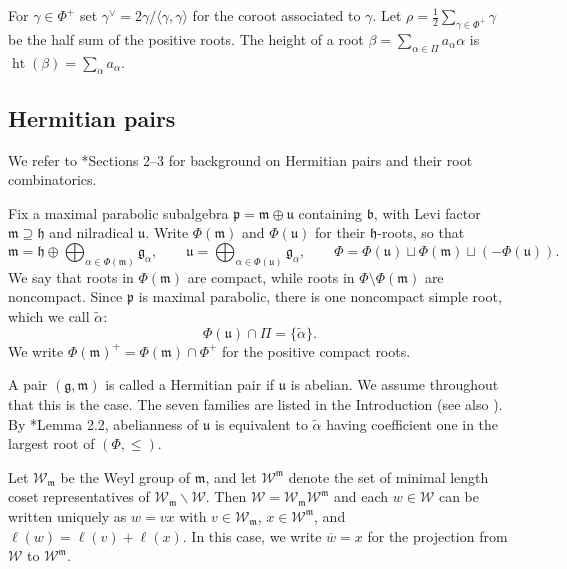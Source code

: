 \documentclass[12pt]{amsart}
\theoremstyle{definition}
\numberwithin{equation}{section}
\newcommand{\g}{\mathfrak g}
\newcommand{\m}{\mathfrak m}
\newcommand{\p}{\mathfrak p}
\newcommand{\mf}{\mathfrak}
\newcommand{\W}{\mathscr W}
\begin{document}
For $\gamma \in \Phi^+$ set $\gamma^\vee=2\gamma/\langle\gamma,\gamma\rangle$ for the coroot associated to $\gamma$. Let
$\rho=\frac12\sum_{\gamma\in\Phi^+}\gamma$ be the half sum of the positive roots. The height of a root $\beta=\sum_{\alpha\in\Pi}a_\alpha\alpha$ is
$\operatorname{ht}(\beta)=\sum_\alpha a_\alpha$.

\subsection{Hermitian pairs}\label{sec:Herm} We refer to \cite{EHP}*{Sections 2--3} for background on Hermitian
pairs and their root combinatorics.

Fix a maximal parabolic subalgebra $\p=\m\oplus\mathfrak{u}$ containing
$\mathfrak b$, with Levi factor $\m\supseteq\mathfrak h$ and
nilradical $\mathfrak{u}$. Write $\Phi(\m)$ and $\Phi(\mathfrak{u})$ for their
$\mathfrak h$-roots, so that
\begin{equation}
\mf{m}=\mathfrak{h}\oplus \bigoplus_{\alpha \in \Phi(\m)} \g_{\alpha},\quad\quad \mf{u}=	\bigoplus_{\alpha \in \Phi(\mathfrak{u})}\g_{\alpha},\quad\quad \Phi=\Phi(\mathfrak{u})\sqcup \Phi(\m)\sqcup (-\Phi(\mathfrak{u})).
\end{equation}
We say that roots in $\Phi(\m)$ are compact, while roots in $\Phi\setminus \Phi(\m)$ are noncompact. Since $\p$ is maximal parabolic, there is one noncompact simple root, which we call $\widetilde{\alpha}$:
\begin{equation}
\Phi(\mathfrak{u})\cap \Pi=\{\widetilde{\alpha}\}.    
\end{equation}
We write $\Phi(\m)^+=\Phi(\m)\cap\Phi^+$ for the positive compact roots.

A pair $(\g,\mathfrak{m})$ is called a Hermitian pair if
$\mathfrak{u}$ is abelian. We assume throughout that this is the
case. The seven families are listed in the Introduction (see also \cite{EHP}). By \cite{EHP}*{Lemma 2.2}, abelianness of $\mathfrak{u}$ is equivalent to
$\widetilde{\alpha}$ having coefficient one in the largest root of $(\Phi,\leq)$.



Let $\W_{\m}$ be the Weyl group of $\m$, and let $\W^{\mathfrak{m}}$ denote the set of minimal length coset representatives of $\W_{\m}\backslash \W$. Then $\W=\W_{\m}\W^{\m}$ and each $w\in \W$ can be written uniquely as $w=vx$ with $v\in \W_{\m}$, $x\in \W^{\m}$, and $\ell(w)=\ell(v)+\ell(x)$. In this case, we write $\overline{w}=x$ for the projection from $\W$ to $\W^{\m}$. 
\end{document}
